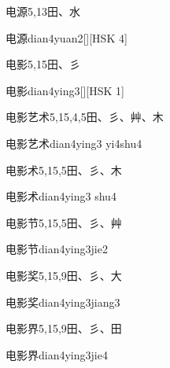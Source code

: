 \begin{Entry}{电源}{5,13}{⽥、⽔}
  \begin{Phonetics}{电源}{dian4yuan2}[][HSK 4]
  \end{Phonetics}
\end{Entry}

\begin{Entry}{电影}{5,15}{⽥、⼺}
  \begin{Phonetics}{电影}{dian4ying3}[][HSK 1]
  \end{Phonetics}
\end{Entry}

\begin{Entry}{电影艺术}{5,15,4,5}{⽥、⼺、⾋、⽊}
  \begin{Phonetics}{电影艺术}{dian4ying3 yi4shu4}
  \end{Phonetics}
\end{Entry}

\begin{Entry}{电影术}{5,15,5}{⽥、⼺、⽊}
  \begin{Phonetics}{电影术}{dian4ying3 shu4}
  \end{Phonetics}
\end{Entry}

\begin{Entry}{电影节}{5,15,5}{⽥、⼺、⾋}
  \begin{Phonetics}{电影节}{dian4ying3jie2}
  \end{Phonetics}
\end{Entry}

\begin{Entry}{电影奖}{5,15,9}{⽥、⼺、⼤}
  \begin{Phonetics}{电影奖}{dian4ying3jiang3}
  \end{Phonetics}
\end{Entry}

\begin{Entry}{电影界}{5,15,9}{⽥、⼺、⽥}
  \begin{Phonetics}{电影界}{dian4ying3jie4}
  \end{Phonetics}
\end{Entry}

